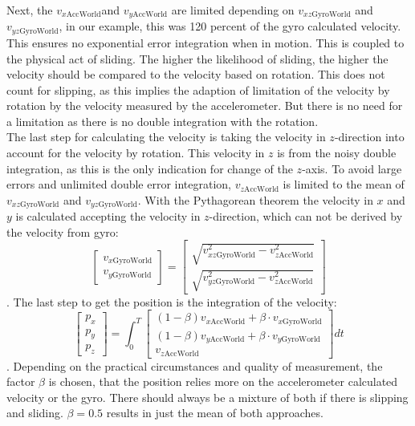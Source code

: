 \documentclass[letterpaper, 10 pt, conference]{ieeeconf}  %
\begin{document}
 
 Next, the $v_{x\text{AccWorld}} $and $v_{y\text{AccWorld}} $ are limited depending on $v_{xz\text{GyroWorld}} $ and $ v_{yz\text{GyroWorld}}$, in our example, this was 120 percent of the gyro calculated velocity.
 This ensures no exponential error integration when in motion.
 This is coupled to the physical act of sliding.
 The higher the likelihood of sliding, the higher the velocity should be compared to the velocity based on rotation.
 This does not count for slipping, as this implies the adaption of limitation of the velocity by rotation by the velocity measured by the accelerometer.
 But there is no need for a limitation as there is no double integration with the rotation.\\
 The last step for calculating the velocity is taking the velocity in $z$-direction into account for the velocity by rotation.
 This velocity in $z$ is from the noisy double integration, as this is the only indication for change of the $z$-axis.
 To avoid large errors and unlimited double error integration, $v_{z\text{AccWorld}} $ is limited to the mean of $v_{xz\text{GyroWorld}} $ and $ v_{yz\text{GyroWorld}}$.
With the Pythagorean theorem the velocity in $x$ and $y$ is calculated accepting the velocity in $z$-direction, which can not be derived by the velocity from gyro:
 \begin{equation}
\begin{bmatrix}
v_{x\text{GyroWorld}} \\ v_{y\text{GyroWorld}}
\end{bmatrix} = 
\begin{bmatrix}
\sqrt{v_{xz\text{GyroWorld}}^2-v_{z\text{AccWorld}}^2}  \\ \sqrt{v_{yz\text{GyroWorld}}^2-v_{z\text{AccWorld}}^2 } 
\end{bmatrix}
\end{equation}.
The last step to get the position is the integration of the velocity:
\begin{equation}
\begin{bmatrix}
p_x \\ p_y \\p_z
\end{bmatrix}
 = \int_0^T \begin{bmatrix}
 (1-\beta)v_{x\text{AccWorld}} + \beta \cdot v_{x\text{GyroWorld}} 
 \\
  (1-\beta)v_{y\text{AccWorld}} + \beta \cdot v_{y\text{GyroWorld}} 
 \\
 v_{z\text{AccWorld}} 
 \end{bmatrix} dt
\end{equation}.
Depending on the practical circumstances and quality of measurement, the factor $\beta$ is chosen, that the position relies more on the accelerometer calculated velocity or the gyro.
There should always be a mixture of both if there is slipping and sliding.
$\beta =0.5$  results in just the mean of both approaches.
\end{document}
